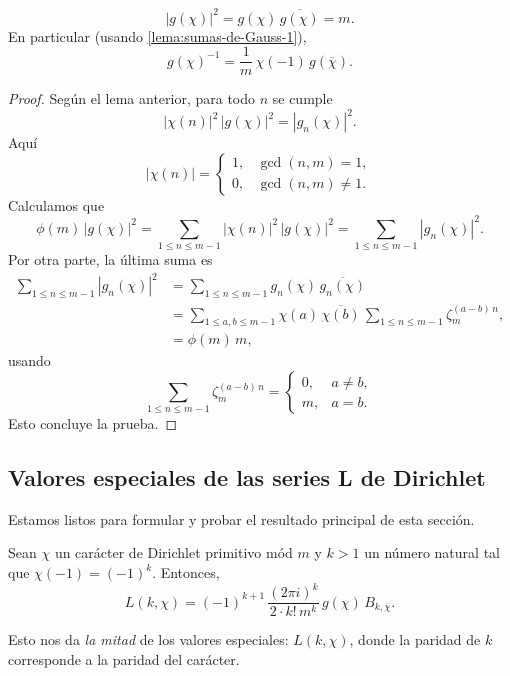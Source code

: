 \begin{lema}
  \label{lema:sumas-de-Gauss-2}
  $$|g (\chi)|^2 = g (\chi)\,\overline{g (\chi)} = m.$$
  En particular (usando \ref{lema:sumas-de-Gauss-1}),
  $$g (\chi)^{-1} = \frac{1}{m}\,\chi (-1)\,g (\overline{\chi}).$$

  \begin{proof}
    Según el lema anterior, para todo $n$ se cumple
    $$|\chi(n)|^2\,|g (\chi)|^2 = |g_n (\chi)|^2.$$
    Aquí
    \[ |\chi (n)| = \begin{cases}
      1, & \gcd (n,m) = 1,\\
      0, & \gcd (n,m) \ne 1.
    \end{cases} \]
    Calculamos que
    $$\phi (m)\,|g (\chi)|^2 = \sum_{1 \le n \le m-1} |\chi (n)|^2\,|g (\chi)|^2 = \sum_{1 \le n \le m-1} |g_n (\chi)|^2.$$
    Por otra parte, la última suma es
    \begin{align*}
      \sum_{1 \le n \le m-1} |g_n (\chi)|^2 & = \sum_{1 \le n \le m-1} g_n (\chi) \, \overline{g_n (\chi)} \\
      & = \sum_{1 \le a,b \le m-1} \chi (a)\,\overline{\chi (b)}\, \sum_{1 \le n \le m-1} \zeta_m^{(a-b)\,n}, \\
      & = \phi (m)\,m,
    \end{align*}
    usando
    \[ \sum_{1 \le n \le m-1} \zeta_m^{(a-b)\,n} = \begin{cases}
      0, & a \ne b,\\
      m, & a = b.
    \end{cases} \]
    Esto concluye la prueba.
  \end{proof}
\end{lema}

\subsection{Valores especiales de las series L de Dirichlet}

Estamos listos para formular y probar el resultado principal de esta sección.

\begin{teorema}
  Sean $\chi$ un carácter de Dirichlet primitivo mód $m$ y $k > 1$ un número
  natural tal que $\chi (-1) = (-1)^k$. Entonces,
  $$L (k,\chi) = (-1)^{k+1} \, \frac{(2\pi i)^k}{2\cdot k! \, m^k}\,g (\chi)\,B_{k,\overline{\chi}}.$$
\end{teorema}

Esto nos da \emph{la mitad} de los valores especiales: $L (k,\chi)$,
donde la paridad de $k$ corresponde a la paridad del carácter.

